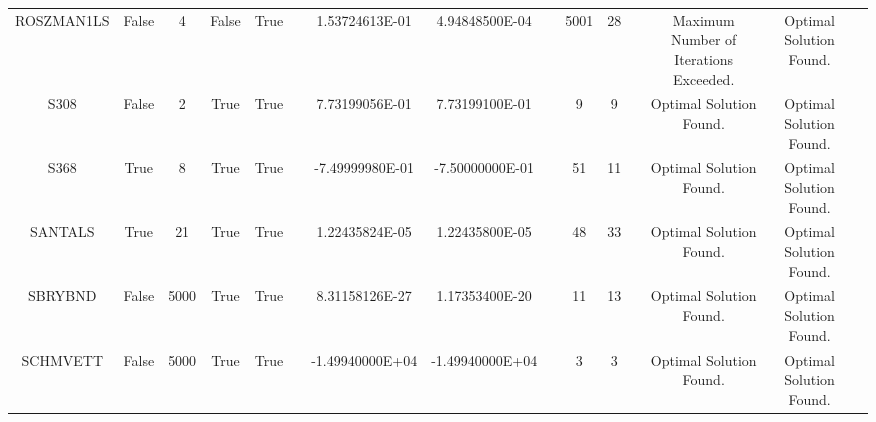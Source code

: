 \begin{longtable}{ccccccccccccccc}
	\cellcolor{default2} ROSZMAN1LS& \cellcolor{default2} False& \cellcolor{default2} 4& \cellcolor{default2} False& \cellcolor{default2} True& \cellcolor{header} & \cellcolor{poor} 1.53724613E-01& \cellcolor{best} 4.94848500E-04& \cellcolor{header} & \cellcolor{poor} 5001& \cellcolor{best} 28& \cellcolor{header} & \cellcolor{default2} Maximum Number of Iterations Exceeded.& \cellcolor{default2} Optimal Solution Found.& \cellcolor{header} \\
	\cellcolor{default1} S308& \cellcolor{default1} False& \cellcolor{default1} 2& \cellcolor{default1} True& \cellcolor{default1} True& \cellcolor{header} & \cellcolor{best} 7.73199056E-01& \cellcolor{ok} 7.73199100E-01& \cellcolor{header} & \cellcolor{best} 9& \cellcolor{best} 9& \cellcolor{header} & \cellcolor{default1} Optimal Solution Found.& \cellcolor{default1} Optimal Solution Found.& \cellcolor{header} \\
	\cellcolor{default2} S368& \cellcolor{default2} True& \cellcolor{default2} 8& \cellcolor{default2} True& \cellcolor{default2} True& \cellcolor{header} & \cellcolor{ok} -7.49999980E-01& \cellcolor{best} -7.50000000E-01& \cellcolor{header} & \cellcolor{poor} 51& \cellcolor{best} 11& \cellcolor{header} & \cellcolor{default2} Optimal Solution Found.& \cellcolor{default2} Optimal Solution Found.& \cellcolor{header} \\
	\cellcolor{default1} SANTALS& \cellcolor{default1} True& \cellcolor{default1} 21& \cellcolor{default1} True& \cellcolor{default1} True& \cellcolor{header} & \cellcolor{ok} 1.22435824E-05& \cellcolor{best} 1.22435800E-05& \cellcolor{header} & \cellcolor{ok} 48& \cellcolor{best} 33& \cellcolor{header} & \cellcolor{default1} Optimal Solution Found.& \cellcolor{default1} Optimal Solution Found.& \cellcolor{header} \\
	\cellcolor{default2} SBRYBND& \cellcolor{default2} False& \cellcolor{default2} 5000& \cellcolor{default2} True& \cellcolor{default2} True& \cellcolor{header} & \cellcolor{best} 8.31158126E-27& \cellcolor{ok} 1.17353400E-20& \cellcolor{header} & \cellcolor{best} 11& \cellcolor{ok} 13& \cellcolor{header} & \cellcolor{default2} Optimal Solution Found.& \cellcolor{default2} Optimal Solution Found.& \cellcolor{header} \\
	\cellcolor{default1} SCHMVETT& \cellcolor{default1} False& \cellcolor{default1} 5000& \cellcolor{default1} True& \cellcolor{default1} True& \cellcolor{header} & \cellcolor{best} -1.49940000E+04& \cellcolor{best} -1.49940000E+04& \cellcolor{header} & \cellcolor{best} 3& \cellcolor{best} 3& \cellcolor{header} & \cellcolor{default1} Optimal Solution Found.& \cellcolor{default1} Optimal Solution Found.& \cellcolor{header} \\

\end{longtable}
